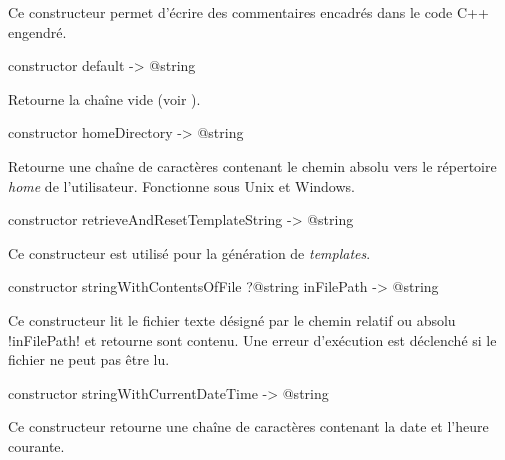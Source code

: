 Ce constructeur permet d'écrire des commentaires encadrés dans le code C++ engendré.



\begin{galgasbox}
constructor default -> @string
\end{galgasbox}

Retourne la chaîne vide (voir ).





\begin{galgasbox}
constructor homeDirectory -> @string
\end{galgasbox}

Retourne une chaîne de caractères contenant le chemin absolu vers le répertoire \emph{home} de l'utilisateur. Fonctionne sous Unix et Windows.







\begin{galgasbox}
constructor retrieveAndResetTemplateString -> @string
\end{galgasbox}

Ce constructeur est utilisé pour la génération de \emph{templates}.





\begin{galgasbox}
constructor stringWithContentsOfFile ?@string inFilePath -> @string
\end{galgasbox}

Ce constructeur lit le fichier texte désigné par le chemin relatif ou absolu \ggs!inFilePath! et retourne sont contenu. Une erreur d'exécution est déclenché si le fichier ne peut pas être lu.







\begin{galgasbox}
constructor stringWithCurrentDateTime -> @string
\end{galgasbox}

Ce constructeur retourne une chaîne de caractères contenant la date et l'heure courante.

